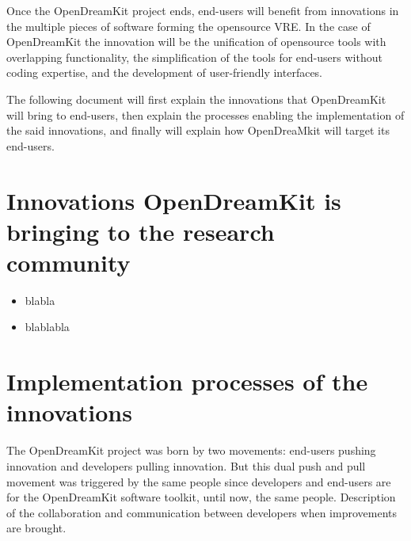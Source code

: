 \documentclass{deliverablereport}
\begin{document}
Once the OpenDreamKit project ends, end-users will benefit from innovations in the multiple pieces of software forming the opensource VRE. In the case of OpenDreamKit the innovation will be the unification of opensource tools with overlapping functionality, the simplification of the tools for end-users without coding expertise, and the development of user-friendly interfaces.

The following document will first explain the innovations that OpenDreamKit will bring to end-users, then explain the processes enabling the implementation of the said innovations, and finally will explain how OpenDreaMkit will target its end-users.


\section{Innovations OpenDreamKit is bringing to the research community}

\begin{itemize}
\item{blabla}
\item{blablabla}
\end{itemize}


\section{Implementation processes of the innovations}

The OpenDreamKit project was born by two movements: end-users pushing innovation and developers pulling innovation. But this dual push and pull movement was triggered by the same people since developers and end-users are for the OpenDreamKit software toolkit, until now, the same people.
Description of the collaboration and communication between developers when improvements are brought.
\end{document}
